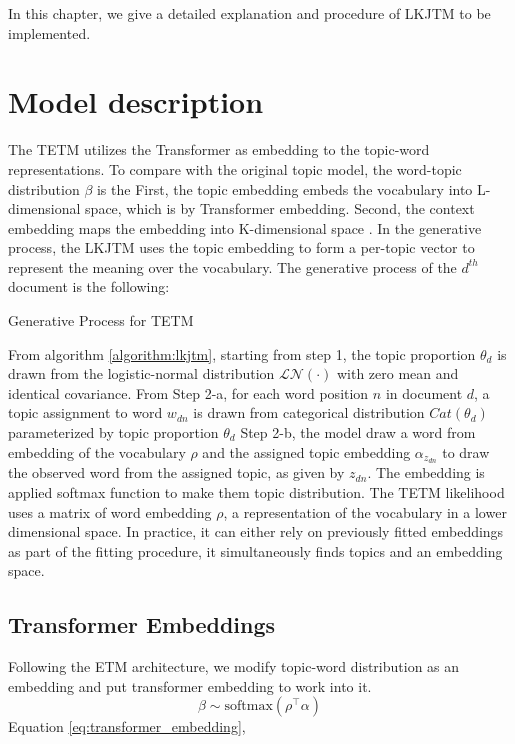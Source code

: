 In this chapter, we give a detailed explanation and procedure of LKJTM to be implemented.
\section{Model description}
The TETM utilizes the Transformer as embedding to the topic-word representations. To compare with the original topic model, the word-topic distribution $ \beta $ is the 
First, the topic embedding embeds the vocabulary into L-dimensional space, which is by Transformer embedding. Second, the context embedding maps the embedding into K-dimensional space . 
In the generative process, the LKJTM uses the topic embedding to form a per-topic vector to represent the meaning over the vocabulary. 
The generative process of the $ d^{th} $ document is the following:\\
\begin{algorithm}[H]
\caption{Generative Process for TETM}
\label{algorithm:lkjtm}
\end{algorithm}
From algorithm \ref{algorithm:lkjtm}, starting from step 1, the topic proportion $ \theta_d $ is drawn from the logistic-normal distribution $ \mathcal{LN}(\cdot) $ with zero mean and identical covariance.
From Step 2-a, for each word position $ n $ in document $ d $, a topic assignment to word $ w_{dn} $ is drawn from categorical distribution $ Cat(\theta_d) $ parameterized by topic proportion $ \theta_d $
Step 2-b, the model draw a word from embedding of the vocabulary $ \rho $ and the assigned topic embedding $ \alpha_{z_{dn}} $ to draw the observed word from the assigned topic, as given by $ z_{dn} $. The embedding is applied softmax function to make them topic distribution.
The TETM likelihood uses a matrix of word embedding $ \rho $, a representation of the vocabulary in a lower dimensional space. In practice, it can either rely on previously fitted embeddings as part of the fitting procedure, it simultaneously finds topics and an embedding space.


\subsection{Transformer Embeddings}
Following the ETM architecture, we modify topic-word distribution as an embedding and put transformer embedding to work into it. 
\begin{equation}\label{eq:transformer_embedding}
\beta\sim\text{softmax}(\rho^\top\alpha)
\end{equation}
Equation \ref{eq:transformer_embedding}, 

